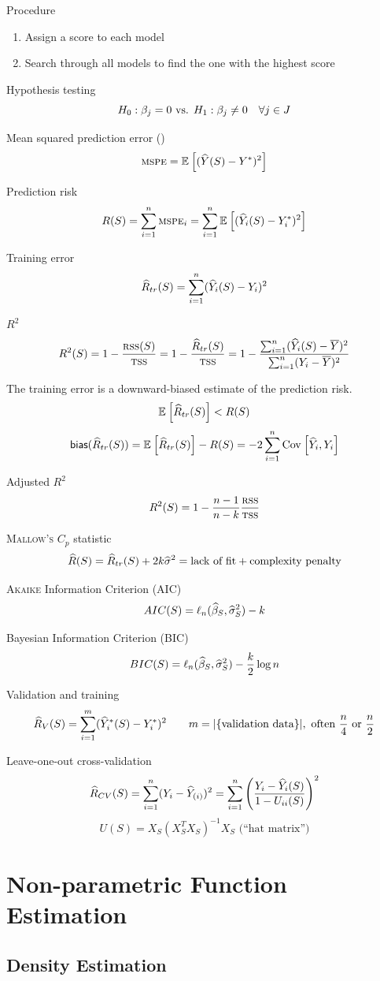 \documentclass[landscape]{article}
\begin{document}
\begin{multicols*}{2}
Procedure
\begin{enumerate}
  \item Assign a score to each model
  \item Search through all models to find the one with the highest score
\end{enumerate}

Hypothesis testing
\[\hyp{\beta_j=0}{\beta_j\neq0} \quad\forall j \in J\]

Mean squared prediction error (\mspe)
\[\textsc{mspe} = \mathbb{E}_{}\left[(\widehat{Y}(S)-Y^*)^2\right]\]

Prediction risk
\[R(S) = \sum_{i=1}^n \textsc{mspe}_i = \sum_{i=1}^n \mathbb{E}_{}\left[(\widehat{Y}_i(S)-Y_i^*)^2\right]\]

Training error
\[\widehat{R}_{tr}(S) = \sum_{i=1}^n(\widehat{Y}_i(S)-Y_i)^2\]

$R^2$
\[R^2(S)
= 1 - \frac{\textsc{rss}(S)}{\textsc{tss}}
= 1 - \frac{\widehat{R}_{tr}(S)}{\textsc{tss}}
= 1 - \frac{\sum_{i=1}^n(\widehat{Y}_i(S)-\overline{Y})^2}{\sum_{i=1}^n(Y_i-\overline{Y})^2}\]

The training error is a downward-biased estimate of the prediction risk.
\[\mathbb{E}_{}\left[\widehat{R}_{tr}(S)\right] < R(S)\]
\[\textsf{bias}(\widehat{R}_{tr}(S)) = \mathbb{E}_{}\left[\widehat{R}_{tr}(S)\right] - R(S) = -2\sum_{i=1}^n\mathrm{Cov}_{}\left[\widehat{Y}_i,Y_i\right]\]

Adjusted $R^2$
\[R^2(S) = 1 - \frac{n-1}{n-k} \frac{\textsc{rss}}{\textsc{tss}}\]

\textsc{Mallow's} $C_p$ statistic
\[\widehat{R}(S) = \widehat{R}_{tr}(S) + 2k\widehat{\sigma}^2
= \text{lack of fit} + \text{complexity penalty}\]

\textsc{Akaike} Information Criterion (AIC)
\[AIC(S) = \ell_n(\widehat{\beta}_S, \widehat{\sigma}^2_S) - k\]

Bayesian Information Criterion (BIC)
\[BIC(S) = \ell_n(\widehat{\beta}_S, \widehat{\sigma}^2_S) - \frac{k}{2}\log n\]

Validation and training
\[\widehat{R}_V(S) = \sum_{i=1}^m(\widehat{Y}_i^*(S) - Y_i^*)^2 \qquad
m = |\{\text{validation data}\}|,
\text{ often }\frac{n}{4}\text { or }\frac{n}{2}\]

Leave-one-out cross-validation
\[\widehat{R}_{CV}(S)
= \sum_{i=1}^n(Y_i - \widehat{Y}_{(i)})^2
= \sum_{i=1}^n \left( \frac{Y_i-\widehat{Y}_i(S)}{1-U_{ii}(S)} \right)^2\]
\[U(S) = X_S(X_S^T X_S)^{-1} X_S \text{ (``hat matrix'')}\]

\section{Non-parametric Function Estimation}

\subsection{Density Estimation}


\end{multicols*}
\end{document}
